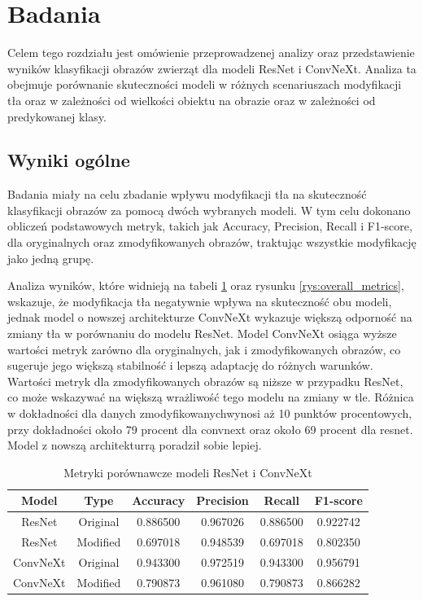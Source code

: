 \chapter*{Badania}

Celem tego rozdziału jest omówienie przeprowadzenej analizy oraz przedstawienie wyników klasyfikacji obrazów zwierząt dla modeli ResNet i ConvNeXt. Analiza ta obejmuje porównanie skuteczności modeli w różnych scenariuszach modyfikacji tła 
oraz w zależności od wielkości obiektu na obrazie oraz w zależności od predykowanej klasy.

\section*{Wyniki ogólne}

Badania miały na celu zbadanie wpływu modyfikacji tła na skuteczność klasyfikacji obrazów za pomocą dwóch wybranych modeli. W tym celu dokonano obliczeń podstawowych metryk, takich jak Accuracy, Precision, Recall i F1-score, dla oryginalnych 
oraz zmodyfikowanych obrazów, traktując wszystkie modyfikację jako jedną grupę.

Analiza wyników, które widnieją na tabeli \ref*{tab:model_comparison_metrics} oraz rysunku \ref*{rys:overall_metrics}, wskazuje, że modyfikacja tła negatywnie wpływa na skuteczność obu modeli, jednak model o nowszej architekturze ConvNeXt wykazuje większą odporność na zmiany tła w porównaniu do modelu ResNet. Model ConvNeXt osiąga wyższe 
wartości metryk zarówno dla oryginalnych, jak i zmodyfikowanych obrazów, co sugeruje jego większą stabilność i lepszą adaptację do różnych warunków. Wartości metryk dla zmodyfikowanych obrazów są niższe w przypadku ResNet, co może 
wskazywać na większą wrażliwość tego modelu na zmiany w tle. Różnica w dokładności dla danych zmodyfikowanychwynosi aż 10 punktów procentowych, przy dokładności około 79 procent dla convnext oraz około 69 procent dla resnet. Model 
z nowszą architekturrą poradził sobie lepiej.

\begin{table}
	\centering
	\begin{tabular}{|c|c|c|c|c|c|}
		\hline
		\textbf{Model} & \textbf{Type} & \textbf{Accuracy} & \textbf{Precision} & \textbf{Recall} & \textbf{F1-score} \\
		\hline
		ResNet & Original & 0.886500 & 0.967026 & 0.886500 & 0.922742 \\
		\hline
		ResNet & Modified & 0.697018 & 0.948539 & 0.697018 & 0.802350 \\
		\hline
		ConvNeXt & Original & 0.943300 & 0.972519 & 0.943300 & 0.956791 \\
		\hline
		ConvNeXt & Modified & 0.790873 & 0.961080 & 0.790873 & 0.866282 \\
		\hline
	\end{tabular}
	\caption{Metryki porównawcze modeli ResNet i ConvNeXt}
	\label{tab:model_comparison_metrics}
\end{table}

